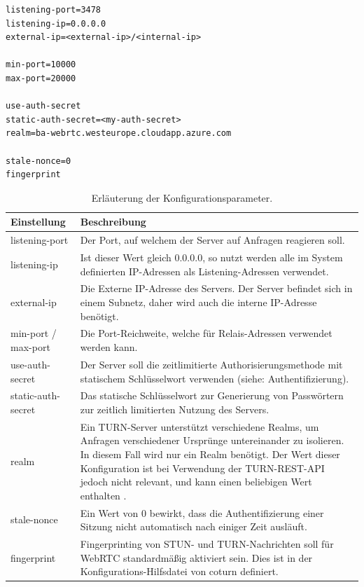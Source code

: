 \lstset{style=STYLE_COMMAND_LINE_ARGUMENT_SINGLE_LINE}
\begin{singlespace}
\begin{minipage}{\textwidth}
\begin{lstlisting}[caption={Coturn-Konfigurationsdatei -- turnserver.conf}, captionpos=b, label={lst:coturnConfig}]
listening-port=3478
listening-ip=0.0.0.0
external-ip=<external-ip>/<internal-ip>

min-port=10000
max-port=20000

use-auth-secret
static-auth-secret=<my-auth-secret>
realm=ba-webrtc.westeurope.cloudapp.azure.com

stale-nonce=0
fingerprint
\end{lstlisting}
\end{minipage}
\end{singlespace}

\begin{table}[ht]
\centering
\begin{tabularx}{\textwidth}{lX}
\toprule
Einstellung&Beschreibung\\

\midrule
listening-port&Der Port, auf welchem der Server auf Anfragen reagieren soll.\\
listening-ip&Ist dieser Wert gleich 0.0.0.0, so nutzt werden alle im System definierten IP-Adressen als Listening-Adressen verwendet.\\
external-ip&Die Externe IP-Adresse des Servers. Der Server befindet sich in einem Subnetz, daher wird auch die interne IP-Adresse benötigt.\\
min-port / max-port&Die Port-Reichweite, welche für Relais-Adressen verwendet werden kann.\\
use-auth-secret&Der Server soll die zeitlimitierte Authorisierungsmethode mit statischem Schlüsselwort verwenden (siehe: Authentifizierung).\\
static-auth-secret&Das statische Schlüsselwort zur Generierung von Passwörtern zur zeitlich limitierten Nutzung des Servers.\\
realm&Ein TURN-Server unterstützt verschiedene \glqq{}Realms\grqq{}, um Anfragen verschiedener Ursprünge untereinander zu isolieren. In diesem Fall wird nur ein \glqq{}Realm\grqq{} benötigt. Der Wert dieser Konfiguration ist bei Verwendung der TURN-REST-API jedoch nicht relevant, und kann einen beliebigen Wert enthalten \cite{turnrestRFC}.\\
stale-nonce&Ein Wert von 0 bewirkt, dass die Authentifizierung einer Sitzung nicht automatisch nach einiger Zeit ausläuft.\\
fingerprint&Fingerprinting von STUN- und TURN-Nachrichten soll für WebRTC standardmäßig aktiviert sein. Dies ist in der Konfigurations-Hilfsdatei von coturn definiert.\\
\bottomrule

\end{tabularx}
\caption{Erläuterung der Konfigurationsparameter.}
\label{table:coturnConfig}
\end{table}

